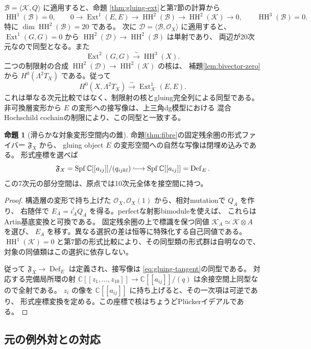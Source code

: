 \documentclass[a4paper,11pt]{ltjsarticle}
\theoremstyle{definition}
\newtheorem{theorem}{命題}[section]
\newcommand{\CC}{\mathbb C}
\newcommand{\OO}{\mathcal O}
\newcommand{\HH}{\operatorname{HH}}
\newcommand{\Spf}{\operatorname{Spf}}
\newcommand{\Def}{\operatorname{Def}}
\newcommand{\Ext}{\operatorname{Ext}}
\begin{document}
$\mathcal B=\langle\mathcal K,Q\rangle$ に適用すると、命題
\ref{thm:gluing-ext}と第7節の計算から
\[
 \HH^1(\mathcal B)=0,\qquad
 0\longrightarrow\Ext^1(E,E)\longrightarrow\HH^2(\mathcal B)
 \longrightarrow\HH^2(\mathcal K)\longrightarrow0,\qquad
 \HH^3(\mathcal B)=0.
\]
特に $\dim\HH^2(\mathcal B)=20$ である。
次に $\mathcal D=\langle\mathcal B,\OO_X\rangle$ に適用すると、
$\Ext^1(G,G)=0$ から
$\HH^2(\mathcal D)\to\HH^2(\mathcal B)$ は単射であり、
両辺が20次元なので同型となる。また
\[
 \Ext^2(G,G)\xrightarrow{\sim}\HH^3(X).
\]
二つの制限射の合成 $\HH^2(\mathcal D)\to\HH^2(\mathcal K)$ の核は、
補題\ref{lem:bivector-zero}から $H^0(\Lambda^2T_X)$ である。従って
\begin{equation}\label{eq:gluing-tangent}
 H^0(X,\Lambda^2T_X)\xrightarrow{\sim}
 \Ext^1_{\mathcal K}(E,E).
\end{equation}
これは単なる次元比較ではなく、制限射の核とgluing完全列による同型である。
非可換層変形から $E$ の変形への接写像は、上三角dg模型における
混合Hochschild cochainの制限により、この同型と一致する。

\begin{theorem}[滑らかな対象変形空間内の錐]\label{thm:object-cone}
命題\ref{thm:fibre}の固定残余圏の形式ファイバー $\mathfrak F_X$ から、
gluing object $E$ の変形空間への自然な写像は閉埋め込みである。
形式座標を選べば
\[
 \mathfrak F_X=
 \Spf\CC[[a_{ij}]]/(q_{ijkl})
 \lhook\joinrel\longrightarrow
 \Spf\CC[[a_{ij}]]=\Def_E.
\]
この7次元の部分空間は、原点では10次元全体を接空間に持つ。
\end{theorem}

\begin{proof}
構造層の変形で持ち上げた $\OO_X,\OO_X(1)$ から、相対mutationで $Q_A$ を作り、
右随伴で $E_A=i_A^!Q_A$ を得る。perfectな射影bimoduleを使えば、
これらはArtin基底変換と可換である。
固定残余圏の上で標識を保つ同値 $\mathcal K_A\simeq\mathcal K\otimes A$ を選び、
$E_A$ を移す。異なる選択の差は恒等に特殊化する自己同値である。
$\HH^1(\mathcal K)=0$ と第7節の形式比較により、その同型類の形式群は自明なので、
対象の同値類はこの選択に依存しない。

従って $\mathfrak F_X\to\Def_E$ は定義され、接写像は
\eqref{eq:gluing-tangent}の同型である。
対応する完備局所環の射
$\CC[[z_1,\ldots,z_{10}]]\to\CC[[a_{ij}]]/(q)$
は余接空間上同型なので全射である。
$z_i$ の像を $\CC[[a_{ij}]]$ に持ち上げると、その一次項は可逆であり、
形式座標変換を定める。この座標で核はちょうどPlückerイデアルである。
\end{proof}

\subsection{元の例外対との対応}
\end{document}
